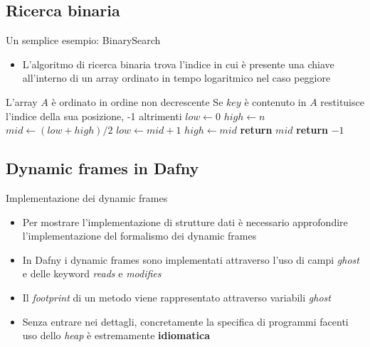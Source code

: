\documentclass[]{beamer}
\begin{document}
\subsection{Ricerca binaria}
\begin{frame}{Un semplice esempio: BinarySearch}
    \begin{itemize}
        \item L'algoritmo di ricerca binaria trova l'indice in cui è presente una chiave all'interno di un array ordinato in tempo logaritmico nel caso peggiore
    \end{itemize}
\begin{algorithm}[H]
\caption{BinarySearch(A[0..n], key)}\label{alg:bin_search}
    \begin{algorithmic}\scriptsize
        \Require L'array $A$ è ordinato in ordine non decrescente
        \Ensure Se $key$ è contenuto in $A$ restituisce l'indice della sua posizione, -1 altrimenti
        \State $low \gets 0$
        \State $high \gets n$
        \\
            \State $mid \gets (low + high) / 2$
                \State $low \gets mid + 1$
                \State $high \gets mid$
            \Else
                \State \textbf{return} $mid$
            \EndIf
        \EndWhile
        \State \textbf{return} $-1$
    \end{algorithmic}
\end{algorithm}
\end{frame}

\subsection{Dynamic frames in Dafny}
\begin{frame}{Implementazione dei dynamic frames}
\begin{itemize}
    \item Per mostrare l'implementazione di strutture dati è necessario approfondire l'implementazione del formalismo dei dynamic frames 
    \item In Dafny i dynamic frames sono implementati attraverso l'uso di campi \textit{ghost} e delle keyword \textit{reads} e \textit{modifies}
    \item Il \textit{footprint} di un metodo viene rappresentato attraverso variabili \textit{ghost}
    \item Senza entrare nei dettagli, concretamente la specifica di programmi facenti uso dello \textit{heap} è estremamente \textbf{idiomatica}
\end{itemize}
\end{frame}
\end{document}
